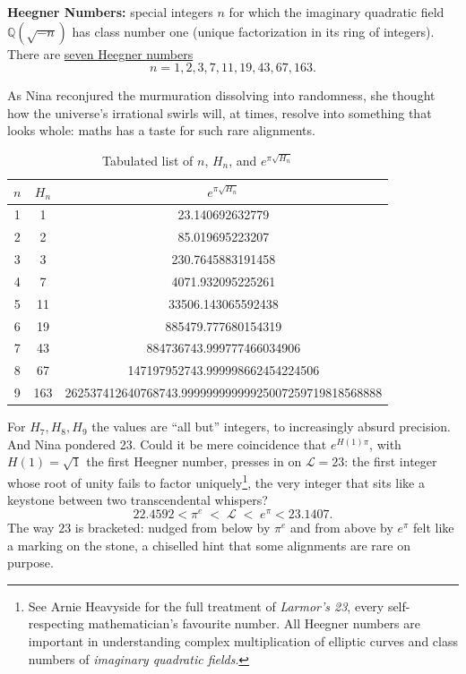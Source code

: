 \newpage

\textbf{Heegner Numbers:} special integers \( n \) for which the imaginary quadratic field \( \mathbb{Q}(\sqrt{-n}) \) has class number one (unique factorization in its ring of integers). There are \href{https://colab.research.google.com/drive/11T6wIoD9c4Wjrojnlqv2p7QSgzDllg44?usp=sharing}{seven Heegner numbers}
\[
n = 1, 2, 3, 7, 11, 19, 43, 67, 163.
\]

\noindent
As Nina reconjured the murmuration dissolving into randomness, she thought how the universe’s irrational swirls will, at times, resolve into something that looks whole: maths has a taste for such rare alignments. 

\begin{table}[ht]
\centering
\begin{tabular}{ccc}
\toprule
\( n \) & \( H_n \) & \( e^{\pi \sqrt{H_n}} \) \\
\midrule
1 & 1 & 23.140692632779 \\
2 & 2 & 85.019695223207 \\
3 & 3 & 230.7645883191458 \\
4 & 7 & 4071.932095225261 \\
5 & 11 & 33506.143065592438 \\
6 & 19 & 885479.777680154319 \\
7 & 43 & 884736743.999777466034906 \\
8 & 67 & 147197952743.999998662454224506 \\
9 & 163 & 262537412640768743.99999999999925007259719818568888 \\
\bottomrule
\end{tabular}
\caption{Tabulated list of \( n \), \( H_n \), and \( e^{\pi \sqrt{H_n}} \)}
\end{table}

\noindent
For \(H_7, H_8, H_9\) the values are “all but” integers, to increasingly absurd precision. And Nina pondered 23. Could it be mere coincidence that \(e^{H(1)\pi}\), with \(H(1)=\sqrt{1}\) the first Heegner number, presses in on \(\mathcal{L}=23\): the first integer whose root of unity fails to factor uniquely\footnote{See Arnie Heavyside for the full treatment of \emph{Larmor’s 23}, every self-respecting mathematician’s favourite number. All Heegner numbers are important in understanding complex multiplication of elliptic curves and class numbers of \emph{imaginary quadratic fields}.}, the very integer that sits like a keystone between two transcendental whispers?
\[
22.4592 < \pi^{e} \;<\; \mathcal{L} \;<\; e^{\pi} < 23.1407.
\]
The way \(23\) is bracketed: nudged from below by \(\pi^{e}\) and from above by \(e^{\pi}\) felt like a marking on the stone, a chiselled hint that some alignments are rare on purpose.


